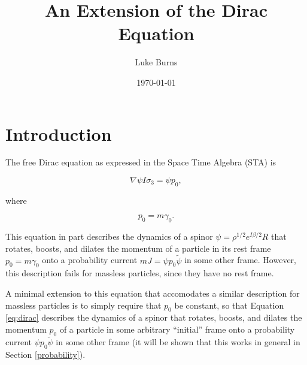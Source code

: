 \documentclass[twocolumn]{article}
\title{An Extension of the Dirac Equation}
\author{Luke Burns}
\date{\small \today\vspace{-5ex}}
\begin{document}

  \section{Introduction}

  The free Dirac equation as expressed in the Space Time Algebra (STA) is\cite{gap}

  \begin{equation}
    \nabla \psi I \sigma_3 = \psi p_0, \label{eq:dirac}
  \end{equation}

  where

  \begin{equation}
    p_0 = m \gamma_0. \label{eq:mass}
  \end{equation} 

  This equation in part describes the dynamics of a spinor $\psi = \rho^{1/2} e^{I \beta/2}R$ that rotates, boosts, and dilates the momentum of a particle in its rest frame $p_0 = m \gamma_0$ onto a probability current $mJ = \psi p_0 \widetilde \psi$ in some other frame. However, this description fails for massless particles, since they have no rest frame.

  A minimal extension to this equation that accomodates a similar description for massless particles is to simply require that $p_0$ be constant, so that Equation \ref{eq:dirac} describes the dynamics of a spinor that rotates, boosts, and dilates the momentum $p_0$ of a particle in some arbitrary ``initial'' frame onto a probability current $\psi p_0 \widetilde \psi$ in some other frame (it will be shown that this works in general in Section \ref{probability}).
\end{document}
